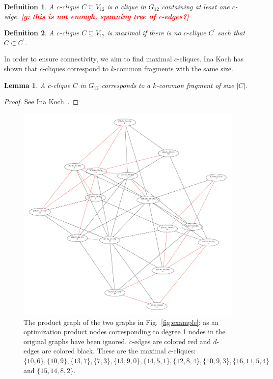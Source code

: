 \documentclass[11pt]{article}
\newcommand{\todo}[1]{\xspace{\bfseries\sffamily\textcolor{red}{[#1]}}\xspace}
\newtheorem{definition}{Definition}[section]
\newtheorem{lemma}[theorem]{Lemma}
\begin{document}
\begin{definition}
A \emph{$c$-clique} $C \subseteq V_{12}$ is a clique in $G_{12}$ containing at
least one $c$-edge. \todo{g: this is not enough. spanning tree of $c$-edges?}
\end{definition}

\begin{definition}
A $c$-clique $C \subseteq V_{12}$ is \emph{maximal} if there is no
$c$-clique $C^\prime$ such that $C \subset C^\prime$.
\end{definition}

In order to ensure connectivity, we aim to find maximal $c$-cliques. Ina Koch
has shown that $c$-cliques correspond to $k$-common fragments with the same size.

\begin{lemma}
A $c$-clique $C$ in $G_{12}$ corresponds to a $k$-common fragment of size $|C|$.
\end{lemma}
\begin{proof}
See Ina Koch~\cite{Koch:2001wi}.
\end{proof}

\begin{figure}
  \center
  \includegraphics[width=1.1\textwidth]{images/product}
  \caption{The product graph of the two graphs in Fig.~\ref{fig:example}; as an optimization product nodes corresponding to
    degree 1 nodes in the original graphs have been ignored. $c$-edges are
    colored red and $d$-edges are colored black. These are the maximal
    $c$-cliques: $\{10,6\}, \{10,9\}, \{13, 7\},
    \{7, 3\}, \{13, 9, 0\}, \{14, 5, 1\}, \{12, 8, 4\}, \{10, 9, 3\}, \{16, 11,
    5, 4\}$ and $\{15, 14, 8, 2\}$.}
  \label{fig:product}
\end{figure}
\end{document}
